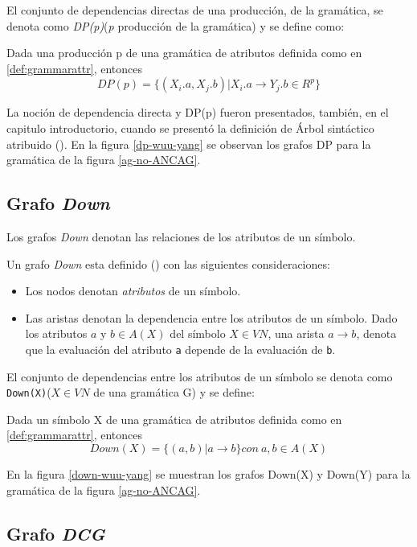 El conjunto de dependencias directas de una producción, de la gramática, se denota como \textit{DP(p)}(\textit{p} producción de la gramática) y se define como:
\begin{definition}
Dada una producción p de una gramática de atributos definida como en \ref{def:grammarattr}, entonces
\begin{equation}
DP(p) = \{(X_{i}.a, X_{j}.b) | X_{i}.a \rightarrow Y_{j}.b \in R^{p} \}
\end{equation}
\end{definition}

La noción de dependencia directa y DP(p) fueron presentados, también, en el capitulo introductorio, cuando se presentó la definición de Árbol sintáctico atribuido (\label{def:ast-attr}).  
En la figura \ref{dp-wuu-yang} se observan los grafos DP para la gramática de la figura \ref{ag-no-ANCAG}.

\subsection{Grafo \textit{Down}}
Los grafos \textit{Down} denotan las relaciones de los atributos de un símbolo. 

Un grafo \textit{Down} esta definido (\cite{estruc-algorit}) con las siguientes consideraciones: 

\begin{itemize}
\item Los nodos denotan \textit{atributos} de un símbolo.
\item Las aristas denotan la dependencia entre los atributos de un símbolo. Dado los atributos $a$ y $b\in A(X)$ del símbolo $X\in VN$, una arista $a\rightarrow b$, denota que la evaluación del atributo \texttt{a} depende de la evaluación de \texttt{b}. 
\end{itemize}
El conjunto de dependencias entre los atributos de un símbolo se denota como  
\texttt{Down(X)}($X\in VN$ de una gramática G) y se define:
\begin{definition}
Dada un símbolo X de una gramática de atributos definida como en \ref{def:grammarattr}, entonces
\begin{equation}
Down(X) = \{(a,b) | a \rightarrow b \} con\ a,b \in A(X)
\end{equation}
\end{definition}
En la figura \ref{down-wuu-yang} se muestran los grafos Down(X) y Down(Y) para la gramática de la figura \ref{ag-no-ANCAG}.

\subsection{Grafo \textit{DCG}}

